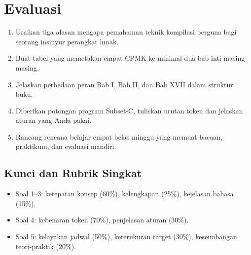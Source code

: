 \section*{Evaluasi}

\begin{enumerate}[label=\arabic*.,leftmargin=*]
  \item Uraikan tiga alasan mengapa pemahaman teknik kompilasi berguna
        bagi seorang insinyur perangkat lunak.
  \item Buat tabel yang memetakan empat CPMK ke minimal dua bab inti
        masing-masing.
  \item Jelaskan perbedaan peran Bab I, Bab II, dan Bab XVII dalam
        struktur buku.
  \item Diberikan potongan program Subset-C, tuliskan urutan token dan
        jelaskan aturan yang Anda pakai.
  \item Rancang rencana belajar empat belas minggu yang memuat bacaan,
        praktikum, dan evaluasi mandiri.
\end{enumerate}

\subsection*{Kunci dan Rubrik Singkat}
\begin{itemize}[leftmargin=*]
  \item Soal 1--3: ketepatan konsep (60\%), kelengkapan (25\%),
        kejelasan bahasa (15\%).
  \item Soal 4: kebenaran token (70\%), penjelasan aturan (30\%).
  \item Soal 5: kelayakan jadwal (50\%), keterukuran target (30\%),
        keseimbangan teori-praktik (20\%).
\end{itemize}
